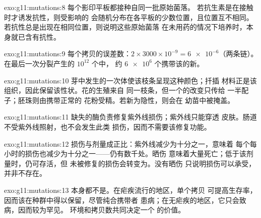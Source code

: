 \begin{solution}{exo:g11:mutations:8}
每个影印平板都接种自同一批原始菌落。
若抗生素是在接触时才诱发抗性，则受影响的
会随机分布在各平板的少数位置，且位置互不相同。
若抗性总是出现在相同位置，则说明这些原始菌落
在未用药的情况下培养时，本身就已含有抗性。
\end{solution}

\begin{solution}{exo:g11:mutations:9}
每个拷贝的误差数：$2 \times 3000 \times 10^{-9} =
\num{6e-6}$（两条链）。在最后一次分裂产生的 $10^{12}$ 个中，
约 $\num{6e6}$ 个携带该的新。
\end{solution}

\begin{solution}{exo:g11:mutations:10}
芽中发生的一次体使该枝条呈现这种颜色；扦插
材料正是该组织，因此保留该性状。花的生殖来自
同一枝条，但一个的改变只传给
一半配子；胚珠则由携带正常的
花粉受精。若新为隐性，则会在
幼苗中被掩盖。
\end{solution}

\begin{solution}{exo:g11:mutations:11}
缺失的酶负责修复紫外线损伤；紫外线只能穿透
皮肤。肠道不受紫外线照射，也不会发生此类
损伤，因而不需要该修复功能。
\end{solution}

\begin{solution}{exo:g11:mutations:12}
损伤与剂量成正比：紫外线减少为十分之一，意味着
每个每小时的损伤也减少为十分之一——仍有数千处。晒伤
意味着大量死亡；低于该剂量时，仍可存活，但
未被修复的损伤会转变为。没有晒伤
只说明损伤可以承受，并非不存在。
\end{solution}

\begin{solution}{exo:g11:mutations:13}
本身都不是。在疟疾流行的地区，单个拷贝
可提高生存率，因而该在种群中得以保留，尽管纯合携带者
患病；在无疟疾的地区，它只会致病，因而较为罕见。
环境和拷贝数共同决定一个
的价值。
\end{solution}

